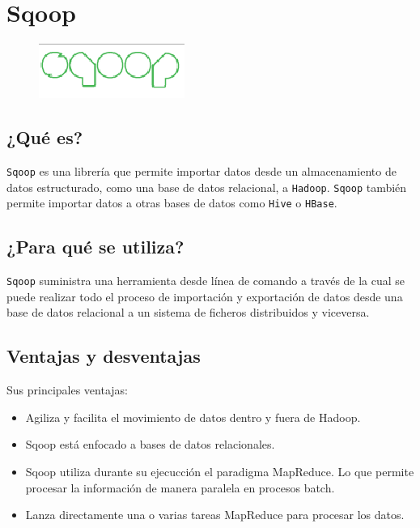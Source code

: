 \documentclass[]{article}
\begin{document}
\section{Sqoop}\label{sqoop}

\begin{figure}[H]
\centering
\includegraphics[width=0.8 \textwidth]{img/sqoop1.png}
\end{figure}

\subsection{¿Qué es?}\label{que-es-2}

\texttt{Sqoop} es una librería que permite importar datos desde un
almacenamiento de datos estructurado, como una base de datos relacional,
a \texttt{Hadoop}. \texttt{Sqoop} también permite importar datos a otras
bases de datos como \texttt{Hive} o \texttt{HBase}.

\subsection{¿Para qué se utiliza?}\label{para-que-se-utiliza-2}

\texttt{Sqoop} suministra una herramienta desde línea de comando a
través de la cual se puede realizar todo el proceso de importación y
exportación de datos desde una base de datos relacional a un sistema de
ficheros distribuidos y viceversa.

\subsection{Ventajas y desventajas}\label{ventajas-y-desventajas-2}

Sus principales ventajas:

\begin{itemize}
\itemsep1pt\parskip0pt
\item
  Agiliza y facilita el movimiento de datos dentro y fuera de Hadoop.
\item
  Sqoop está enfocado a bases de datos relacionales.
\item
  Sqoop utiliza durante su ejecucción el paradigma MapReduce. Lo que
  permite procesar la información de manera paralela en procesos batch.
\item
  Lanza directamente una o varias tareas MapReduce para procesar los
  datos.
\end{itemize}
\end{document}
